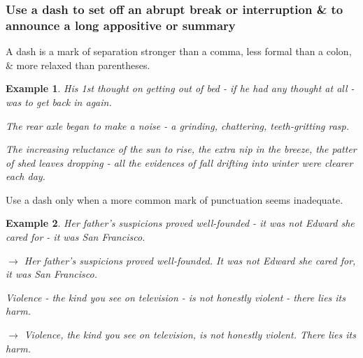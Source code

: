 \documentclass{article}
\newtheorem{example}{Example}
\begin{document}

\subsubsection{Use a dash to set off an abrupt break or interruption \& to announce a long appositive or summary}
A dash is a mark of separation stronger than a comma, less formal than a colon, \& more relaxed than parentheses.
\begin{example}
	His 1st thought on getting out of bed - if he had any thought at all - was to get back in again.
	
	The rear axle began to make a noise - a grinding, chattering, teeth-gritting rasp.
	
	The increasing reluctance of the sun to rise, the extra nip in the breeze, the patter of shed leaves dropping - all the evidences of fall drifting into winter were clearer each day.
\end{example}
Use a dash only when a more common mark of punctuation seems inadequate.
\begin{example}
	Her father's suspicions proved well-founded - it was not Edward she cared for - it was San Francisco.
	
	$\to$ Her father's suspicions proved well-founded. It was not Edward she cared for, it was San Francisco.
	
	Violence - the kind you see on television - is not honestly violent - there lies its harm.
	
	$\to$ Violence, the kind you see on television, is not honestly violent. There lies its harm.
\end{example}

\end{document}
